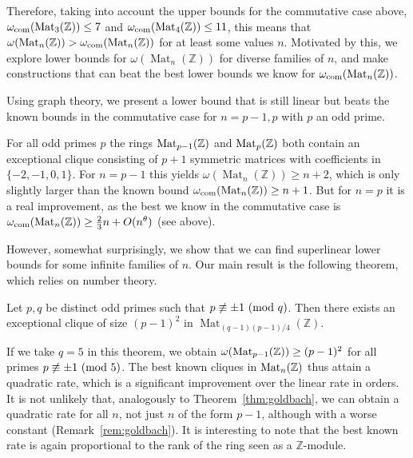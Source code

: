 \documentclass{amsart}
\theoremstyle{plain}
\newenvironment{maintheorem}[1]
  {\renewcommand\theinnermaintheorem{\ref{#1}}\innermaintheorem}
  {\endinnermaintheorem}
\theoremstyle{definition}
\DeclareMathOperator{\Mat}{Mat}
\newcommand{\Z}{\ensuremath{\mathbb{Z}}}
\begin{document}
Therefore, taking into account the upper bounds for the commutative case above, $\omega_{\textup{com}}(\Mat_3(\Z))\leq 7$ and $\omega_{\textup{com}}(\Mat_4(\Z))\leq 11$, this means that $\omega(\Mat_n(\Z))> \omega_{\textup{com}}(\Mat_n(\Z))$ for at least some values $n$. Motivated by this, we explore lower bounds for $\omega(\Mat_n(\Z))$ for diverse families of $n$, and make constructions that can beat the best lower bounds we know for $\omega_{\textup{com}}(\Mat_n(\Z))$. 

Using graph theory, we present a lower bound that is still linear but beats the known bounds in the commutative case for $n=p-1,p$ with $p$ an odd prime.

\begin{maintheorem}{thm:graphs}
For all odd primes \(p\) the rings \(\textup{Mat}_{p-1}(\Z)\) and \(\textup{Mat}_p(\Z)\) both contain an exceptional clique consisting of \(p+1\) symmetric matrices with coefficients in \(\{-2,-1,0,1\}\).
\end{maintheorem}
For $n=p-1$ this yields $\omega(\Mat_n(\Z))\geq n+2$, which is only slightly larger than the known bound $\omega_{\textup{com}}(\Mat_n(\Z))\geq n+1$. But for $n=p$ it is a real improvement, as the best we know in the commutative case is  $\omega_{\textup{com}}(\Mat_n(\Z))\geq \frac{2}{3}n + O(n^{\theta})$ (see above).

However, somewhat surprisingly, we show that we can find superlinear lower bounds for some infinite families of $n$. Our main result is the following theorem, which relies on number theory.

\begin{maintheorem}{th:main}
Let \(p,q\) be distinct odd primes such that \(p\not\equiv \pm 1\ (\textup{mod }q)\).
Then there exists an exceptional clique of size $(p-1)^2$ in $\Mat_{(q-1)(p-1)/4}(\Z)$.
\end{maintheorem}

If we take \(q=5\) in this theorem, we obtain \(\omega(\textup{Mat}_{p-1}(\Z))\geq (p-1)^2\) for all primes \(p\not\equiv \pm 1\ (\textup{mod }5)\). 
The best known cliques in \(\textup{Mat}_{n}(\Z)\) thus attain a quadratic rate, which is a significant improvement over the linear rate in orders.
It is not unlikely that, analogously to Theorem~\ref{thm:goldbach}, we can obtain a quadratic rate for all \(n\), not just \(n\) of the form \(p-1\), although with a worse constant (Remark~\ref{rem:goldbach}).
It is interesting to note that the best known rate is again proportional to the rank of the ring seen as a \(\Z\)-module.
\end{document}
